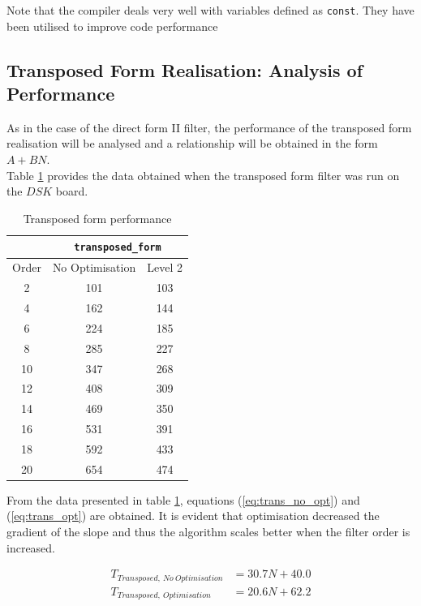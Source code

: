 \documentclass{article}
\begin{document}
Note that the compiler deals very well with variables defined as {\tt const}. They have been utilised to improve code performance 

\subsection{Transposed Form Realisation: Analysis of Performance}

As in the case of the direct form II filter, the performance of the transposed form realisation will be analysed and a relationship will be obtained in the form $A+BN$.\\

Table \ref{tab:trans_form} provides the data obtained when the transposed form filter was run on the $DSK$ board. 

\begin{table}[H]
  \centering
    \begin{tabular}{|c|c|c|}
\cline{2-3}    \multicolumn{1}{c|}{} & \multicolumn{2}{c|}{{\tt transposed\_form} } \\
    \hline
    Order & No Optimisation & Level 2 \\
    \hline
    2     & 101 & 103 \\
    \hline
    4     & 162 & 144 \\
    \hline
    6     & 224 & 185 \\
    \hline
    8     & 285 & 227 \\
    \hline
    10    & 347 & 268 \\
    \hline
    12    & 408 & 309 \\
    \hline
    14    & 469 & 350 \\
    \hline
    16    & 531 & 391 \\
    \hline
    18    & 592 & 433 \\
    \hline
    20    & 654 & 474 \\
    \hline
    \end{tabular}%
  \caption{Transposed form performance}
  \label{tab:trans_form}%
\end{table}%

From the data presented in table \ref{tab:trans_form}, equations (\ref{eq:trans_no_opt}) and (\ref{eq:trans_opt}) are obtained. It is evident that optimisation decreased the gradient of the slope and thus the algorithm scales better when the filter order is increased.

\begin{align}
    T_{Transposed,\  No \ Optimisation} &= 30.7N + 40.0 \label{eq:trans_no_opt}\\
    T_{Transposed,\  Optimisation} &= 20.6N + 62.2 \label{eq:trans_opt}
\end{align} 
\end{document}
